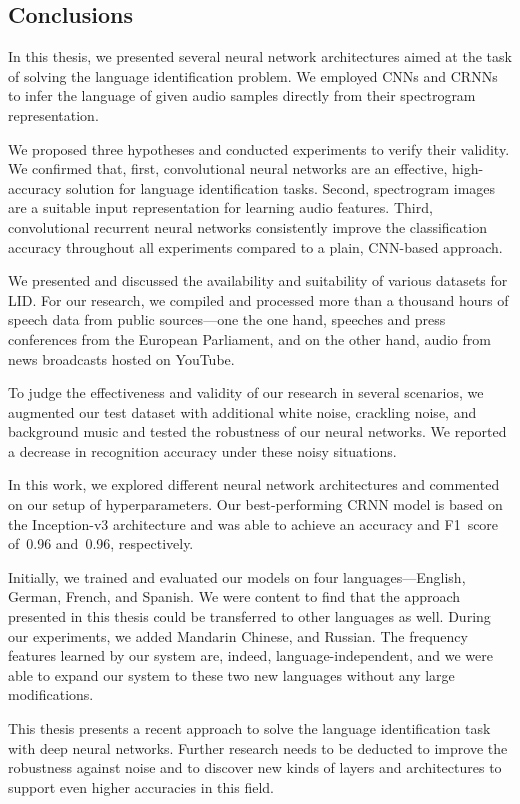 \subsection{Conclusions}
In this thesis, we presented several neural network architectures aimed at the task of solving the language identification problem. We employed CNNs and CRNNs to infer the language of given audio samples directly from their spectrogram representation. 

We proposed three hypotheses and conducted experiments to verify their validity. We confirmed that, first, convolutional neural networks are an effective, high-accuracy solution for language identification tasks. Second, spectrogram images are a suitable input representation for learning audio features. Third, convolutional recurrent neural networks consistently improve the classification accuracy throughout all experiments compared to a plain, CNN-based approach.

We presented and discussed the availability and suitability of various datasets for LID. For our research, we compiled and processed more than a thousand hours of speech data from public sources---one the one hand, speeches and press conferences from the European Parliament, and on the other hand, audio from news broadcasts hosted on YouTube.

To judge the effectiveness and validity of our research in several scenarios, we augmented our test dataset with additional white noise, crackling noise, and background music and tested the robustness of our neural networks. We reported a decrease in recognition accuracy under these noisy situations.

In this work, we explored different neural network architectures and commented on our setup of hyperparameters. Our best-performing CRNN model is based on the Inception-v3 architecture and was able to achieve an accuracy and F1~score of~\num{0.96} and~\num{0.96}, respectively.

Initially, we trained and evaluated our models on four languages---English, German, French, and Spanish. We were content to find that the approach presented in this thesis could be transferred to other languages as well. During our experiments, we added Mandarin Chinese, and Russian. The frequency features learned by our system are, indeed, language-independent, and we were able to expand our system to these two new languages without any large modifications.

This thesis presents a recent approach to solve the language identification task with deep neural networks. Further research needs to be deducted to improve the robustness against noise and to discover new kinds of layers and architectures to support even higher accuracies in this field. 
